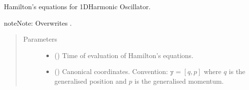 \documentclass[a4paper,landscape,10pt,english]{sphinxmanual}
\begin{document}
\begin{fulllineitems}
\begin{fulllineitems}
\begin{quote}
\begin{description}
\begin{itemize}
\end{itemize}

\end{description}\end{quote}

\end{fulllineitems}


\begin{fulllineitems}
\label{\detokenize{code_docs/simulation_api.simulation:simulation_api.simulation.simulations.HarmonicOsc1D.dyn_sys_eqns}}
Hamilton’s equations for 1D\sphinxhyphen{}Harmonic Oscillator.

\begin{sphinxadmonition}{note}{Note:}
Overwrites {\hyperref[\detokenize{code_docs/simulation_api.simulation:simulation_api.simulation.simulations.Simulation.dyn_sys_eqns}]{}}.
\end{sphinxadmonition}
\begin{quote}\begin{description}
\item[{Parameters}] \leavevmode\begin{itemize}
\item {} 
 () \textendash{} Time of evaluation of Hamilton’s equations.

\item {} 
 (\sphinxstyleliteralemphasis{\sphinxupquote{, }}\sphinxstyleliteralemphasis{\sphinxupquote{ (}}\sphinxstyleliteralemphasis{\sphinxupquote{,}}\sphinxstyleliteralemphasis{\sphinxupquote{)}}) \textendash{} Canonical coordinates.
Convention: \(\texttt{y} = [q, p]\) where \(q\) is the
generalised position and \(p\) is the generalised momentum.


\end{itemize}
\end{description}
\end{quote}
\end{fulllineitems}
\end{fulllineitems}
\end{document}
